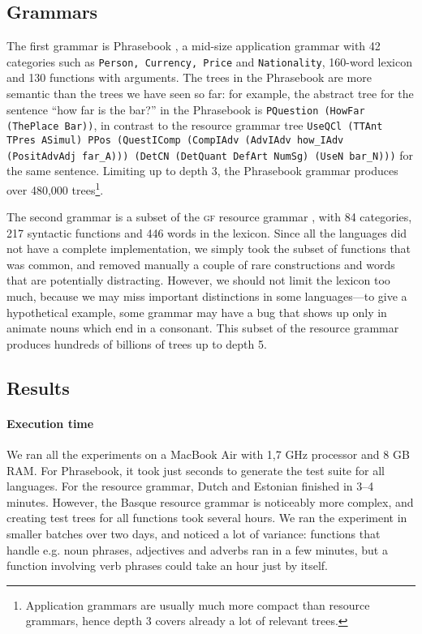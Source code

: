 \documentclass[11pt]{article}
\def\t#1{\texttt{#1}}
\def\gf{\textsc{gf}}
\begin{document}
\subsection{Grammars}

The first grammar is Phrasebook \cite{ranta2010phrasebook}, a mid-size
application grammar with 42 categories such as \t{Person, Currency,
  Price} and \t{Nationality}, 160-word lexicon and 130 functions with
arguments. The trees in the Phrasebook are more semantic than the
trees we have seen so far: for example, the abstract tree for the sentence ``how far is the bar?'' in the Phrasebook is {\tt PQuestion (HowFar (ThePlace Bar))}, in contrast to the resource grammar tree
{\tt \small UseQCl (TTAnt TPres ASimul) PPos (QuestIComp
  (CompIAdv (AdvIAdv how\_IAdv (PositAdvAdj far\_A))) 
  (DetCN (DetQuant DefArt NumSg) (UseN bar\_N)))} for the same
sentence. Limiting up to depth 3, the Phrasebook grammar produces over
480,000 trees\footnote{Application grammars are usually
much more compact than resource grammars, hence depth 3 covers already
a lot of relevant trees.}.

The second grammar is a subset of the \gf{} resource
grammar \cite{ranta2009rgl}, with 84 categories, 217 syntactic
functions and 446 words in the lexicon. Since all the languages did
not have a complete implementation, we simply took the subset of functions that was
common, and removed manually a couple of rare constructions and words
that are potentially distracting. However, we should not limit the
lexicon too much, because we may miss important distinctions  in some
languages---to give a hypothetical example, some grammar may have a
bug that shows up only in animate nouns which end in a consonant. This
subset of the resource grammar produces hundreds of billions of trees
up to depth 5.
\subsection{Results}

\paragraph{Execution time} We ran all the experiments on a MacBook Air
with 1,7 GHz processor and 8 GB RAM. For Phrasebook, it took just
seconds to generate the test suite for all languages. For the resource
grammar, Dutch and Estonian finished in 3--4 minutes. However, the
Basque resource grammar is noticeably more complex, and creating test
trees for all functions took several hours. We ran the experiment in
smaller batches over two days, and noticed a lot of variance:
functions that handle e.g. noun phrases, adjectives and adverbs ran in
a few minutes, but a function involving verb phrases could take an
hour just by itself.
\end{document}
